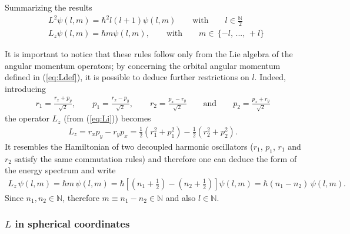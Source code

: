 Summarizing the results 
\begin{align}
    & L^2 \psi(l,m) = \hbar^2 l(l+1) \psi(l,m) \qquad \text{with} \qquad l \in \frac{\mathbb{N}}{2} \\
    & L_z \psi(l,m) = \hbar m \psi(l,m), \qquad \text{with} \qquad m \in \, \{-l, \, ..., \, +l \}
\end{align}

It is important to notice that these rules follow only from the Lie algebra of the angular momentum operators; by concerning the orbital angular momentum defined in (\ref{eq:Ldef}), it is possible to deduce further restrictions on $l$. Indeed, introducing
\begin{align*}
    r_1 = \frac{r_x+p_y}{\sqrt{2}}, \qquad p_1 = \frac{r_x-p_y}{\sqrt{2}}, \qquad r_2 = \frac{p_x-r_y}{\sqrt{2}} \qquad \text{and} \qquad p_2 = \frac{p_x+r_y}{\sqrt{2}}
\end{align*}
the operator $L_z$ (from (\ref{eq:Li})) becomes
\begin{align*}
        L_z = r_x p_y - r_y p_x = \frac{1}{2}\left(r_1^2 + p_1^2\right) - \frac{1}{2}\left(r_2^2+p_2^2\right).
\end{align*}
It resembles the Hamiltonian of two decoupled harmonic oscillators ($r_1$, $p_1$, $r_1$ and $r_2$ satisfy the same commutation rules) and therefore one can deduce the form of the energy spectrum and write 
\begin{align*}
    L_z \, \psi(l,m) = \hbar m \, \psi(l,m) = \hbar \left[ \left(n_1 +\frac{1}{2}\right) - \left(n_2 + \frac{1}{2}\right)\right] \psi(l,m) = \hbar (n_1-n_2) \, \psi(l,m).
\end{align*}
Since $n_1, n_2 \in \mathbb{N}$, therefore $m \equiv n_1 - n_2 \in \mathbb{N}$ and also $l \in \mathbb{N}$. 

\subsubsection{$L$ in spherical coordinates}

